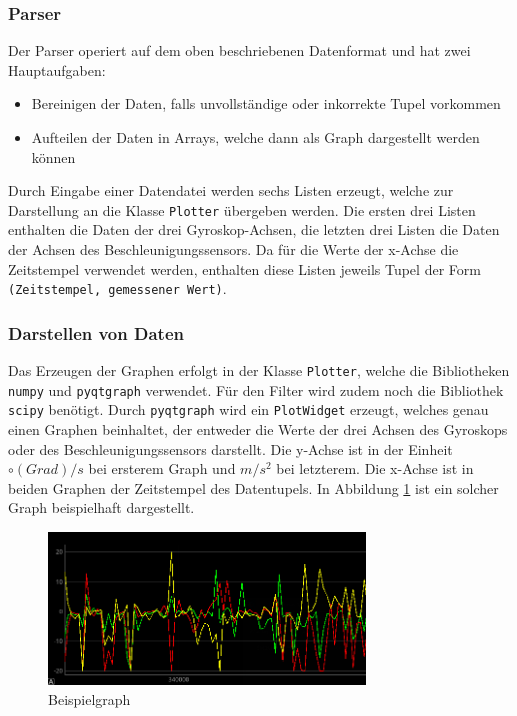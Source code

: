 \subsubsection{Parser}
Der Parser operiert auf dem oben beschriebenen Datenformat und hat zwei Hauptaufgaben:
\begin{itemize}
 \item Bereinigen der Daten, falls unvollständige oder inkorrekte Tupel vorkommen
 \item Aufteilen der Daten in Arrays, welche dann als Graph dargestellt werden können
\end{itemize}
Durch Eingabe einer Datendatei werden sechs Listen erzeugt, welche zur Darstellung an die Klasse \texttt{Plotter} übergeben werden. Die ersten drei Listen enthalten die Daten der drei Gyroskop-Achsen, die letzten drei Listen die Daten der Achsen des Beschleunigungssensors. Da für die Werte der x-Achse die Zeitstempel verwendet werden, enthalten diese Listen jeweils Tupel der Form \texttt{(Zeitstempel, gemessener Wert)}.
\subsubsection{Darstellen von Daten}
Das Erzeugen der Graphen erfolgt in der Klasse \texttt{Plotter}, welche die Bibliotheken \texttt{numpy} und \texttt{pyqtgraph} verwendet. Für den Filter wird zudem noch die Bibliothek \texttt{scipy} benötigt. Durch \texttt{pyqtgraph} wird ein \texttt{PlotWidget} erzeugt, welches genau einen Graphen beinhaltet, der entweder die Werte der drei Achsen des Gyroskops oder des Beschleunigungssensors darstellt. Die y-Achse ist in der Einheit $\circ(Grad)/s$ bei ersterem Graph und $m/s^{2}$ bei letzterem. Die x-Achse ist in beiden Graphen der Zeitstempel des Datentupels. In Abbildung \ref{fig:k3_4-graph.png} ist ein solcher Graph beispielhaft dargestellt.
\begin{figure}[h]
	\centering
	\includegraphics[width=0.75\textwidth]{images/k3-graph.png}
	\caption {Beispielgraph}
	\label{fig:k3_4-graph.png} 
\end{figure}

